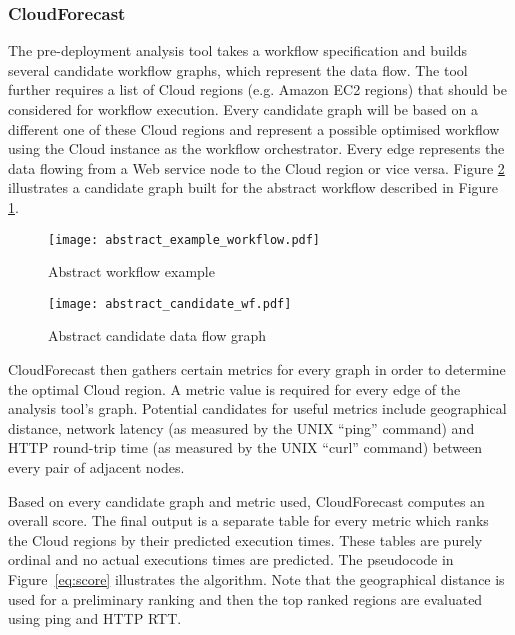 \documentclass[10pt, conference, compsocconf]{IEEEtran}
\newcommand{\sysname}{CloudForecast\xspace}
\begin{document}
\subsubsection{\sysname}

The pre-deployment analysis tool takes a workflow specification and builds several candidate workflow graphs, which represent the data flow. The tool further requires a list of Cloud regions (e.g. Amazon EC2 regions) that should be considered for workflow execution. Every candidate graph will be based on a different one of these Cloud regions and represent a possible optimised workflow using the Cloud instance as the workflow orchestrator. Every edge represents the data flowing from a Web service node to the Cloud region or vice versa. Figure \ref{fig:abstract_candidate_wf_graph} illustrates a candidate graph built for the abstract workflow described in Figure \ref{fig:abstract_example_workflow}.

\begin{figure}[h]
\centering
\texttt{[image: abstract\_example\_workflow.pdf]}

\caption{Abstract workflow example}
\label{fig:abstract_example_workflow}
\end{figure}


\begin{figure}[h]
\centering
\texttt{[image: abstract\_candidate\_wf.pdf]}

\caption{Abstract candidate data flow graph}
\label{fig:abstract_candidate_wf_graph}
\end{figure}


\sysname then gathers certain metrics for every graph in order to determine the optimal Cloud region. A metric value is required for every edge of the analysis tool's graph. Potential candidates for useful metrics include geographical distance, network latency (as measured by the UNIX ``ping'' command) and HTTP round-trip time (as measured by the UNIX ``curl'' command) between every pair of adjacent nodes.


Based on every candidate graph and metric used, \sysname computes an overall score. The final output is a separate table for every metric which ranks the Cloud regions by their predicted execution times. These tables are purely ordinal and no actual executions times are predicted. The pseudocode in Figure~\ref{eq:score} illustrates the algorithm. Note that the geographical distance is used for a preliminary ranking and then the top  ranked regions are evaluated using ping and HTTP RTT.
\end{document}
